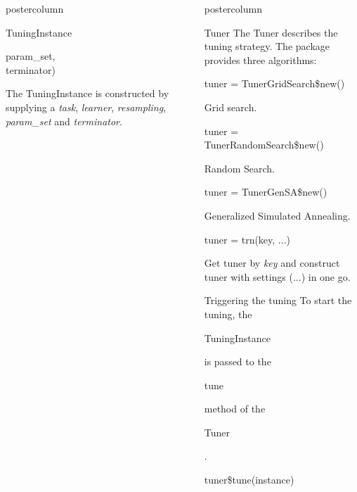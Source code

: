 \documentclass{beamer}
\newlength{\columnheight} %
\newcommand{\codeinline}[1]{\begin{codeboxinline}#1\end{codeboxinline}}
\begin{document}
\begin{frame}[fragile]{}
\begin{columns}
\begin{column}{.245\textwidth}
\begin{beamercolorbox}[center]{postercolumn}
\begin{minipage}{.98\textwidth}
{\begin{myblock}{TuningInstance}
\begin{codeboxmultiline}[width=18cm]
						\hspace*{1ex}param\_set,\\
						\hspace*{1ex}terminator)
					\end{codeboxmultiline}
					The TuningInstance is constructed by supplying a \textit{task}, \textit{learner}, \textit{resampling}, \textit{param\_set} and \textit{terminator}. 
					\\
				\end{myblock}	
					\vfill}
				\end{minipage}
			\end{beamercolorbox}
		\end{column}
		\begin{column}{.245\textwidth}
			\begin{beamercolorbox}[center]{postercolumn}
				\begin{minipage}{.98\textwidth}
					\parbox[t][\columnheight]{\textwidth}{
						\begin{myblock}{Tuner}
							The Tuner describes the tuning strategy. The package provides three algorithms:
							\\
							\begin{codebox}
								tuner = TunerGridSearch\$new()
							\end{codebox}
							Grid search.
							\\
							\begin{codebox}
								tuner = TunerRandomSearch\$new()
							\end{codebox}
							Random Search.
							\\
							\begin{codebox}
								tuner = TunerGenSA\$new()
							\end{codebox}
							Generalized Simulated Annealing.
							\\
							\begin{codebox}
								tuner = trn(key, ...)
							\end{codebox}
							Get tuner by \textit{key} and construct tuner with settings (...) in one go.
						\end{myblock}
						\begin{myblock}{Triggering the tuning}
							To start the tuning, the \codeinline{TuningInstance} is passed to the \codeinline{tune} method of the \codeinline{Tuner}.
							\\
							\begin{codebox}
								tuner\$tune(instance)
							\end{codebox}

\end{myblock}}
\end{minipage}
\end{beamercolorbox}
\end{column}
\end{columns}
\end{frame}
\end{document}
